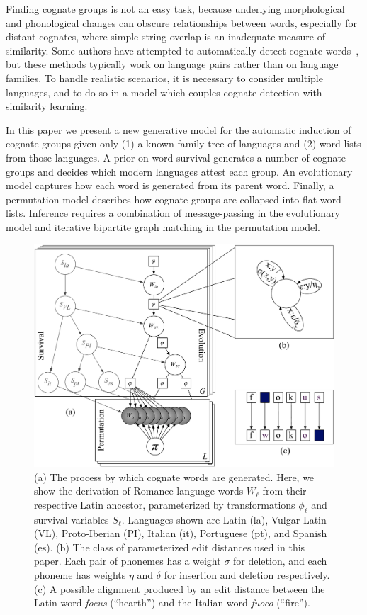 \documentclass[11pt,a4paper]{article}
\begin{document}
Finding cognate groups is not an easy task, because underlying
morphological and phonological changes can obscure relationships
between words, especially for distant cognates, where simple string
overlap is an inadequate measure of similarity.  Some authors have
attempted to automatically detect cognate
words~\cite{lowe94reconstruction,oakes00computer,Kondrak01identifyingcognates,mulloni07automatic},
but these methods typically work on language pairs rather than on
language families.  To handle realistic scenarios, it is
necessary to consider multiple languages, and to do so in a model
which couples cognate detection with similarity learning.

In this paper we present a new generative model for the automatic
induction of cognate groups given only (1) a known family tree of
languages and (2) word lists from those languages.  A prior on word
survival generates a number of cognate groups and decides which
modern languages attest each group.  An evolutionary model captures
how each word is generated from its parent word.  Finally, a
permutation model describes how cognate groups are collapsed into
flat word lists.  Inference requires a combination of message-passing
in the evolutionary model and iterative bipartite graph matching
in the permutation model.

\begin{figure}
  \centering
  \includegraphics[scale=0.35]{gmodel}
  \caption{(a) The process by which cognate words are generated.
  Here, we show the derivation of Romance language words $W_\ell$
  from their respective Latin ancestor, parameterized by transformations
  $\phi_\ell$ and survival variables $S_\ell$. Languages shown are
  Latin (la), Vulgar Latin (VL), Proto-Iberian (PI), Italian (it),
  Portuguese (pt), and Spanish (es). 
  (b) The class of parameterized edit distances used in this paper.
  Each pair of phonemes has a weight $\sigma$ for deletion, and
  each phoneme has weights $\eta$ and $\delta$ for insertion and
  deletion respectively.
  (c) A possible alignment produced by an edit distance between the
  Latin word \textit{focus} (``hearth'') and the Italian word \textit{fuoco} (``fire'').
  } \label{fig:gmodel}
\end{figure}
\end{document}
